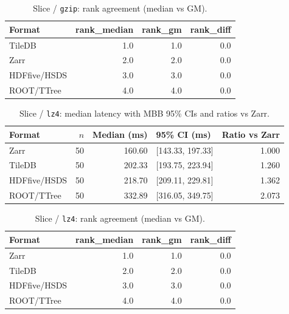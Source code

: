 \documentclass[nomenclature, english, bibtex]{kththesis}
\numberwithin{listing}{chapter}
\begin{document}
\begin{table}[H]
  \centering
  \caption{Slice / \texttt{gzip}: rank agreement (median vs \gls{GM}).}
  \label{tab:np_slice_gzip_rank}
  \begin{tabular}{l r r r}
    \toprule
    Format & rank\_median & rank\_gm & rank\_diff \\
    \midrule
    TileDB & 1.0 & 1.0 & 0.0 \\
    Zarr   & 2.0 & 2.0 & 0.0 \\
    \gls{HDFfive}/\gls{HSDS}   & 3.0 & 3.0 & 0.0 \\
    \gls{ROOT}/\gls{TTree}   & 4.0 & 4.0 & 0.0 \\
    \bottomrule
  \end{tabular}
\end{table}

\begin{table}[H]
  \centering
  \caption{Slice / \texttt{lz4}: median latency with \gls{MBB} 95\% CIs and ratios vs Zarr.}
  \label{tab:np_slice_lz4_median}
  \begin{tabular}{l r r l r}
    \toprule
    Format & $n$ & Median (ms) & 95\% \gls{CI} (ms) & Ratio vs Zarr \\
    \midrule
    Zarr   & 50 & 160.60 & [143.33, 197.33] & 1.000 \\
    TileDB & 50 & 202.33 & [193.75, 223.94] & 1.260 \\
    \gls{HDFfive}/\gls{HSDS}   & 50 & 218.70 & [209.11, 229.81] & 1.362 \\
    \gls{ROOT}/\gls{TTree}   & 50 & 332.89 & [316.05, 349.75] & 2.073 \\
    \bottomrule
  \end{tabular}
\end{table}

\begin{table}[H]
  \centering
  \caption{Slice / \texttt{lz4}: rank agreement (median vs \gls{GM}).}
  \label{tab:np_slice_lz4_rank}
  \begin{tabular}{l r r r}
    \toprule
    Format & rank\_median & rank\_gm & rank\_diff \\
    \midrule
    Zarr   & 1.0 & 1.0 & 0.0 \\
    TileDB & 2.0 & 2.0 & 0.0 \\
    \gls{HDFfive}/\gls{HSDS}   & 3.0 & 3.0 & 0.0 \\
    \gls{ROOT}/\gls{TTree}   & 4.0 & 4.0 & 0.0 \\
    \bottomrule
  \end{tabular}
\end{table}
\end{document}
